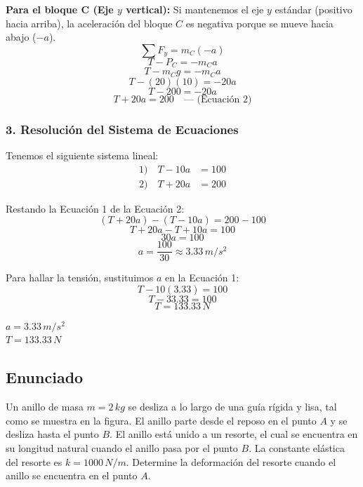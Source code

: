 \documentclass[12pt, a4paper]{article}
\begin{document}
\textbf{Para el bloque C (Eje $y$ vertical):}
Si mantenemos el eje $y$ estándar (positivo hacia arriba), la aceleración del bloque $C$ es negativa porque se mueve hacia abajo ($-a$).
$$ \sum F_y = m_C (-a) $$
$$ T - P_C = - m_C a $$
$$ T - m_C g = - m_C a $$
$$ T - (20)(10) = -20a $$
$$ T - 200 = -20a $$
$$ T + 20a = 200 \quad \text{--- (Ecuación 2)} $$

\subsubsection*{3. Resolución del Sistema de Ecuaciones}
Tenemos el siguiente sistema lineal:
\begin{align*}
    1) \quad T - 10a &= 100 \\
    2) \quad T + 20a &= 200
\end{align*}

Restando la Ecuación 1 de la Ecuación 2:
$$ (T + 20a) - (T - 10a) = 200 - 100 $$
$$ T + 20a - T + 10a = 100 $$
$$ 30a = 100 $$
$$ a = \frac{100}{30} \approx 3.33 \, \si{m/s^2} $$

Para hallar la tensión, sustituimos $a$ en la Ecuación 1:
$$ T - 10(3.33) = 100 $$
$$ T - 33.33 = 100 $$
$$ T = 133.33 \, \si{N} $$

\begin{tcolorbox}[colback=green!5!white, colframe=green!50!black, title=Respuesta Final]
\centering 
$a = 3.33 \, \si{m/s^2}$ \\
$T = 133.33 \, \si{N}$
\end{tcolorbox}

\newpage

\subsection*{Enunciado}
Un anillo de masa $m = 2 \, \si{kg}$ se desliza a lo largo de una guía rígida y lisa, tal como se muestra en la figura. El anillo parte desde el reposo en el punto $A$ y se desliza hasta el punto $B$. El anillo está unido a un resorte, el cual se encuentra en su longitud natural cuando el anillo pasa por el punto $B$. La constante elástica del resorte es $k = 1000 \, \si{N/m}$. Determine la deformación del resorte cuando el anillo se encuentra en el punto $A$.
\end{document}
